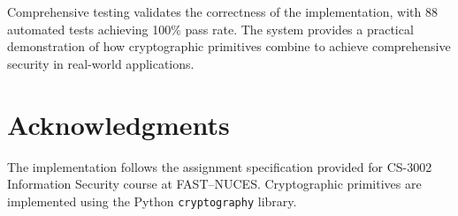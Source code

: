 \documentclass[runningheads]{llncs}
\begin{document}
Comprehensive testing validates the correctness of the implementation, with 88 automated tests achieving 100\% pass rate. The system provides a practical demonstration of how cryptographic primitives combine to achieve comprehensive security in real-world applications.

\section*{Acknowledgments}

The implementation follows the assignment specification provided for CS-3002 Information Security course at FAST--NUCES. Cryptographic primitives are implemented using the Python \texttt{cryptography} library.
\end{document}

